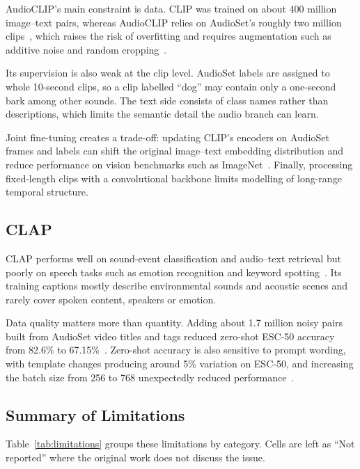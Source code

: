 \documentclass[pdflatex,sn-mathphys-num]{sn-jnl}%
\theoremstyle{thmstyleone}%
\theoremstyle{thmstyletwo}%
\theoremstyle{thmstylethree}%
\begin{document}
AudioCLIP's main constraint is data. CLIP was trained on about 400 million image--text pairs, whereas AudioCLIP relies on AudioSet's roughly two million clips~\cite{gemmeke2017audioset}, which raises the risk of overfitting and requires augmentation such as additive noise and random cropping~\cite{guzhov2022audioclip}.

Its supervision is also weak at the clip level. AudioSet labels are assigned to whole 10-second clips, so a clip labelled ``dog'' may contain only a one-second bark among other sounds. The text side consists of class names rather than descriptions, which limits the semantic detail the audio branch can learn.

Joint fine-tuning creates a trade-off: updating CLIP's encoders on AudioSet frames and labels can shift the original image--text embedding distribution and reduce performance on vision benchmarks such as ImageNet~\cite{guzhov2022audioclip}. Finally, processing fixed-length clips with a convolutional backbone limits modelling of long-range temporal structure.

\subsection{CLAP}

CLAP performs well on sound-event classification and audio--text retrieval but poorly on speech tasks such as emotion recognition and keyword spotting~\cite{elizalde2023clap}. Its training captions mostly describe environmental sounds and acoustic scenes and rarely cover spoken content, speakers or emotion.

Data quality matters more than quantity. Adding about 1.7 million noisy pairs built from AudioSet video titles and tags reduced zero-shot ESC-50 accuracy from 82.6\% to 67.15\%~\cite{elizalde2023clap}. Zero-shot accuracy is also sensitive to prompt wording, with template changes producing around 5\% variation on ESC-50, and increasing the batch size from 256 to 768 unexpectedly reduced performance~\cite{elizalde2023clap}. %

\subsection{Summary of Limitations}

Table~\ref{tab:limitations} groups these limitations by category. Cells are left as ``Not reported'' where the original work does not discuss the issue.
\end{document}
